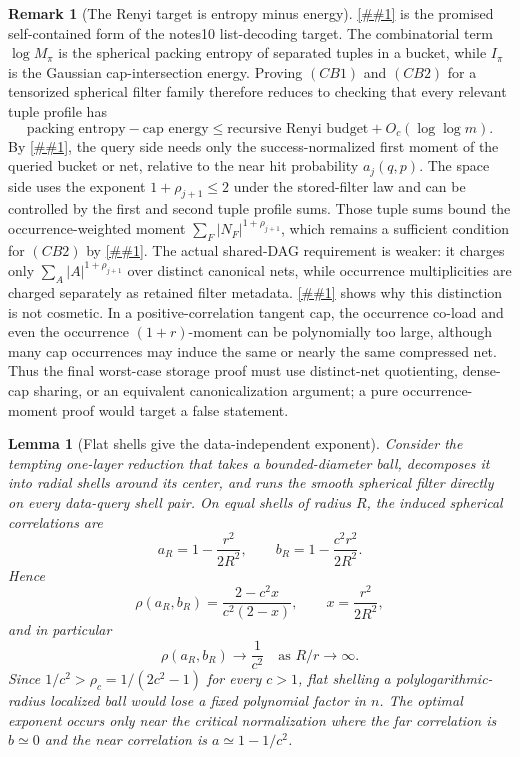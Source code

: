 \documentclass[10pt]{article}
\newcommand{\cref}[1]{\ref{##1}}
\newcommand{\Cref}[1]{\ref{##1}}
\newtheorem{lemma}[theorem]{Lemma}
\theoremstyle{definition}
\newtheorem{remark}[theorem]{Remark}
\begin{document}
\begin{remark}[The Renyi target is entropy minus energy]
   \label{rem:renyi-entropy-energy-target}
   \Cref{cor:tuple-profile-renyi-certificate} is the promised self-contained
   form of the notes10 list-decoding target.  The combinatorial term
   \(\log M_\pi\) is the spherical packing entropy of separated tuples in a
   bucket, while \(I_\pi\) is the Gaussian cap-intersection energy.  Proving
   \((CB1)\) and \((CB2)\) for a tensorized spherical filter family therefore
   reduces to checking that every relevant tuple profile has
   \[
      \text{packing entropy}-\text{cap energy}
      \le
      \text{recursive Renyi budget}+O_c(\log\log m).
   \]
   By \cref{lem:first-moment-query-compression}, the query side needs only the
   success-normalized first moment of the queried bucket or net, relative to
   the near hit probability \(a_j(q,p)\).  The space side uses the exponent
   \(1+\rho_{j+1}\le2\) under the stored-filter law and can be controlled by
   the first and second tuple profile sums.  Those tuple sums bound the
   occurrence-weighted moment
   \(\sum_F |N_F|^{1+\rho_{j+1}}\), which remains a sufficient condition for
   \((CB2)\) by \cref{lem:occurrence-moments-dominate-dag}.  The actual
   shared-DAG requirement is weaker: it charges only
   \(\sum_A|A|^{1+\rho_{j+1}}\) over distinct canonical nets, while occurrence
   multiplicities are charged separately as retained filter metadata.
   \Cref{lem:positive-correlation-occurrence-obstruction} shows why this
   distinction is not cosmetic.  In a positive-correlation tangent cap, the
   occurrence co-load and even the occurrence \((1+r)\)-moment can be
   polynomially too large, although many cap occurrences may induce the same
   or nearly the same compressed net.  Thus the final worst-case storage proof
   must use distinct-net quotienting, dense-cap sharing, or an equivalent
   canonicalization argument; a pure occurrence-moment proof would target a
   false statement.
\end{remark}

\begin{lemma}[Flat shells give the data-independent exponent]\label{lem:flat-shell-obstruction}
   Consider the tempting one-layer reduction that takes a bounded-diameter ball,
   decomposes it into radial shells around its center, and runs the smooth
   spherical filter directly on every data-query shell pair. On equal shells of
   radius $R$, the induced spherical correlations are
   \[
      a_R=1-\frac{r^2}{2R^2},
      \qquad
      b_R=1-\frac{c^2r^2}{2R^2}.
   \]
   Hence
   \[
      \rho(a_R,b_R)
      =
      \frac{2-c^2x}{c^2(2-x)},
      \qquad
      x=\frac{r^2}{2R^2},
   \]
   and in particular
   \[
      \rho(a_R,b_R)\to\frac1{c^2}
      \quad\text{as } R/r\to\infty .
   \]
   Since $1/c^2>\rho_c=1/(2c^2-1)$ for every $c>1$, flat shelling a
   polylogarithmic-radius localized ball would lose a fixed polynomial factor
   in $n$. The optimal exponent occurs only near the critical normalization
   where the far correlation is $b\simeq0$ and the near correlation is
   $a\simeq1-1/c^2$.
\end{lemma}
\end{document}
